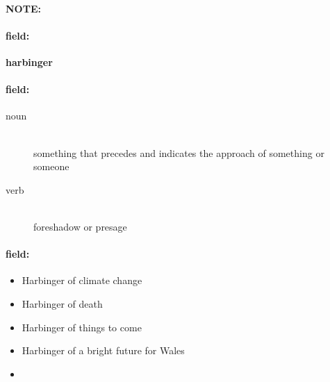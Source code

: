\documentclass[12pt]{article}
\newenvironment{note}{\paragraph{NOTE:}}{}
\newenvironment{field}{\paragraph{field:}}{}
\begin{document}
\begin{note}
\begin{field}
\textbf{\large harbinger}
\end{field}


\begin{field}
\begin{description}
\item[noun] \hfill \\ 
something that precedes and indicates the approach of something or someone

\item[verb] \hfill \\ 
foreshadow or presage

\end{description}
\end{field}

\begin{field}
\begin{itemize}
\item Harbinger of climate change
\item Harbinger of death
\item Harbinger of things to come
\item Harbinger of a bright future for Wales
\item 
\end{itemize}
\end{field}
\end{note}
\end{document}
